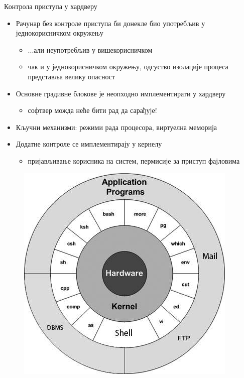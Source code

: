 \documentclass[xcolor=table]{beamer}
\begin{document}
    \begin{frame}[allowframebreaks]{Контрола приступа у хардверу}
        \begin{itemize}
            \item Рачунар без контроле приступа би донекле био употребљив у једнокорисничком окружењу
            \begin{itemize}
                \item ...али неупотребљив у вишекорисничком
                \item чак и у једнокорисничком окружењу, одсуство изолације процеса представља велику опасност
            \end{itemize}
            \item Основне градивне блокове је неопходно имплементирати у хардверу
            \begin{itemize}
                \item софтвер можда неће бити рад да сарађује!
            \end{itemize}
            \item Кључни механизми: режими рада процесора, виртуелна меморија
            \item Додатне контроле се имплементирају у кернелу
            \begin{itemize}
                \item пријављивање корисника на систем, пермисије за приступ фајловима
            \end{itemize}
        \end{itemize}
        
        \framebreak
        
        \begin{figure}
            \centering
            \includegraphics[width=\textwidth,height=0.8\textheight,keepaspectratio]{images/unix_architecture.jpg}
            \label{fig:unix_architecture.jpg}
        \end{figure}
    \end{frame}
    
\end{document}
